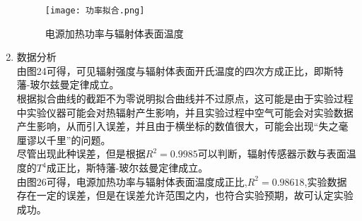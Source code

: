 \documentclass[dvipsnames, svgnames,a4paper,11pt]{article}
\begin{document}
\begin{enumerate}
\begin{figure}[{H}]
	\centering
	\texttt{[image: 功率拟合.png]}
	\caption{电源加热功率与辐射体表面温度}
	\label{}
\end{figure}
\item 数据分析\\
    由图24可得，可见辐射强度与辐射体表面开氏温度的四次方成正比，即斯特藩-玻尔兹曼定律成立。\\
	根据拟合曲线的截距不为零说明拟合曲线并不过原点，这可能是由于实验过程中实验仪器可能会对热辐射产生影响，并且实验过程中空气可能会对实验数据产生影响，从而引入误差，并且由于横坐标的数值很大，可能会出现“失之毫厘谬以千里”的问题。\\
	尽管出现此种误差，但是根据$R^{2}=0.9985$可以判断，辐射传感器示数与表面温度的$T^4$成正比，斯特藩-玻尔兹曼定律成立。\\
    由图26可得，电源加热功率与辐射体表面温度成正比,$R^{2}=0.98618$,实验数据存在一定的误差，但是在误差允许范围之内，也符合实验预期，故可认定实验成功。

	\end{enumerate}
	
\end{document}
